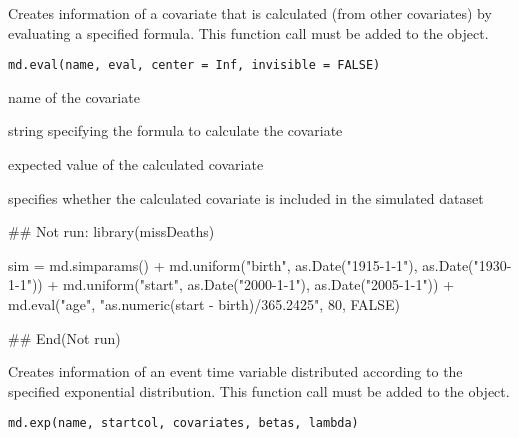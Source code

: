\documentclass[a4paper]{book}
\begin{document}
%
\begin{Description}\relax
Creates information of a covariate that is calculated (from other covariates) by evaluating a specified formula.
This function call must be added to the  object.
\end{Description}
%
\begin{Usage}
\begin{verbatim}
md.eval(name, eval, center = Inf, invisible = FALSE)
\end{verbatim}
\end{Usage}
%
\begin{Arguments}
\begin{ldescription}
\item[\code{name}] name of the covariate

\item[\code{eval}] string specifying the formula to calculate the covariate

\item[\code{center}] expected value of the calculated covariate

\item[\code{invisible}] specifies whether the calculated covariate is included in the simulated dataset
\end{ldescription}
\end{Arguments}
%
\begin{Examples}
\begin{ExampleCode}

## Not run: 
library(missDeaths)

sim = md.simparams() +
    md.uniform("birth", as.Date("1915-1-1"), as.Date("1930-1-1")) +
      md.uniform("start", as.Date("2000-1-1"), as.Date("2005-1-1")) +
          md.eval("age", "as.numeric(start - birth)/365.2425", 80, FALSE)

## End(Not run)
\end{ExampleCode}
\end{Examples}
%
\begin{Description}\relax
Creates information of an event time variable distributed according to the specified exponential distribution.
This function call must be added to the  object.
\end{Description}
%
\begin{Usage}
\begin{verbatim}
md.exp(name, startcol, covariates, betas, lambda)
\end{verbatim}
\end{Usage}
\end{document}
